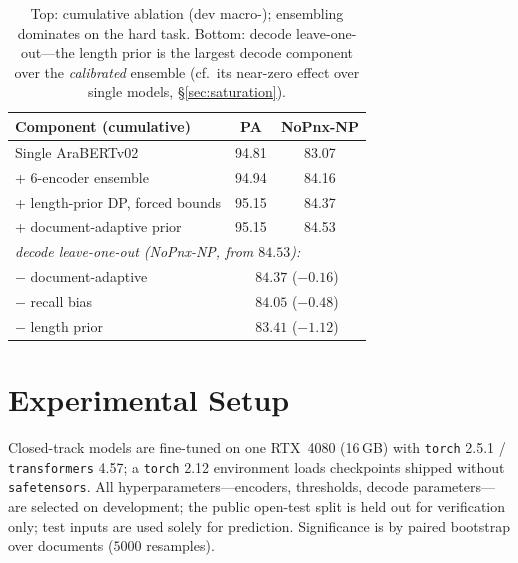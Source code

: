 \begin{table}[t]\centering\small
\begin{tabular}{lcc}
\toprule
Component (cumulative) & PA & NoPnx-NP \\
\midrule
Single AraBERTv02            & 94.81 & 83.07 \\
\;+ 6-encoder ensemble       & 94.94 & 84.16 \\
\;+ length-prior DP, forced bounds & 95.15 & 84.37 \\
\;+ document-adaptive prior  & 95.15 & 84.53 \\
\midrule
\multicolumn{3}{l}{\emph{decode leave-one-out (NoPnx-NP, from $84.53$):}}\\
\;$-$ document-adaptive       & \multicolumn{2}{c}{$84.37$ ($-0.16$)} \\
\;$-$ recall bias             & \multicolumn{2}{c}{$84.05$ ($-0.48$)} \\
\;$-$ length prior            & \multicolumn{2}{c}{$83.41$ ($-1.12$)} \\
\bottomrule
\end{tabular}
\caption{Top: cumulative ablation (dev macro-\fone{}); ensembling dominates on the
hard task. Bottom: decode leave-one-out---the length prior is the largest decode
component over the \emph{calibrated} ensemble (cf.\ its near-zero effect over single
models, \S\ref{sec:saturation}).}
\label{tab:ablation}
\end{table}

\section{Experimental Setup}
Closed-track models are fine-tuned on one RTX~4080 (16\,GB) with \texttt{torch}
2.5.1 / \texttt{transformers} 4.57; a \texttt{torch} 2.12 environment loads
checkpoints shipped without \texttt{safetensors}. All hyperparameters---encoders,
thresholds, decode parameters---are selected on development; the public open-test
split is held out for verification only; test inputs are used solely for prediction.
Significance is by paired bootstrap over documents ($5000$ resamples).

